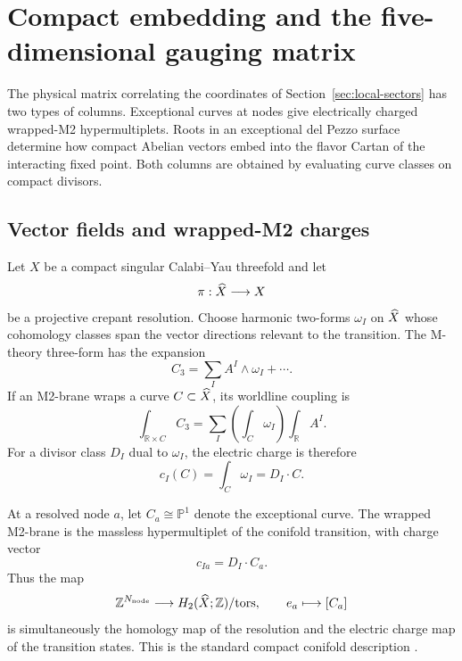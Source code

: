 \section{Compact embedding and the five-dimensional gauging matrix}
\label{sec:compact-gauging}

The physical matrix correlating the coordinates of
Section~\ref{sec:local-sectors} has two types of columns. Exceptional curves at
nodes give electrically charged wrapped-M2 hypermultiplets. Roots in an
exceptional del Pezzo surface determine how compact Abelian vectors embed into
the flavor Cartan of the interacting fixed point. Both columns are obtained by
evaluating curve classes on compact divisors.

\subsection{Vector fields and wrapped-M2 charges}
\label{subsec:m2-charges}

Let $X$ be a compact singular Calabi--Yau threefold and let
\begin{equation}
 \pi:\widehat X\longrightarrow X
 \label{eq:crepant-resolution}
\end{equation}
be a projective crepant resolution. Choose harmonic two-forms $\omega_I$ on
$\widehat X$ whose cohomology classes span the vector directions relevant to the
transition. The M-theory three-form has the expansion
\begin{equation}
 C_3=\sum_I A^I\wedge\omega_I+\cdots .
 \label{eq:c3-reduction}
\end{equation}
If an M2-brane wraps a curve $C\subset\widehat X$, its worldline coupling is
\begin{equation}
 \int_{\mathbb R\times C}C_3
 =\sum_I\left(\int_C\omega_I\right)\int_{\mathbb R}A^I.
 \label{eq:m2-coupling}
\end{equation}
For a divisor class $D_I$ dual to $\omega_I$, the electric charge is therefore
\begin{equation}
 c_I(C)=\int_C\omega_I=D_I\cdot C.
 \label{eq:m2-charge}
\end{equation}

At a resolved node $a$, let $C_a\cong\mathbb P^1$ denote the exceptional
curve. The wrapped M2-brane is the massless hypermultiplet of the conifold
transition, with charge vector
\begin{equation}
 c_{Ia}=D_I\cdot C_a.
 \label{eq:nodal-charge}
\end{equation}
Thus the map
\begin{equation}
 \mathbb Z^{N_{\mathrm{node}}}\longrightarrow
 H_2(\widehat X;\mathbb Z)/\mathrm{tors},
 \qquad e_a\longmapsto[C_a]
 \label{eq:nodal-homology-map}
\end{equation}
is simultaneously the homology map of the resolution and the electric charge
map of the transition states. This is the standard compact conifold
description \cite{Katz:1996,Mohaupt:2004de}.

